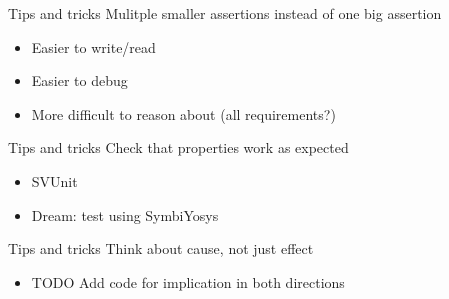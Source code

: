 \documentclass{beamer}
\begin{document}
\begin{frame}{Tips and tricks}
Mulitple smaller assertions instead of one big assertion

\begin{itemize}
 \item Easier to write/read
 \item Easier to debug
 \item More difficult to reason about (all requirements?)
\end{itemize}
\end{frame}


\begin{frame}{Tips and tricks}
Check that properties work as expected

\begin{itemize}
 \item SVUnit
 \item Dream: test using SymbiYosys
\end{itemize}
\end{frame}


\begin{frame}{Tips and tricks}
Think about cause, not just effect

\begin{itemize}
 \item TODO Add code for implication in both directions
\end{itemize}
\end{frame}
\end{document}
